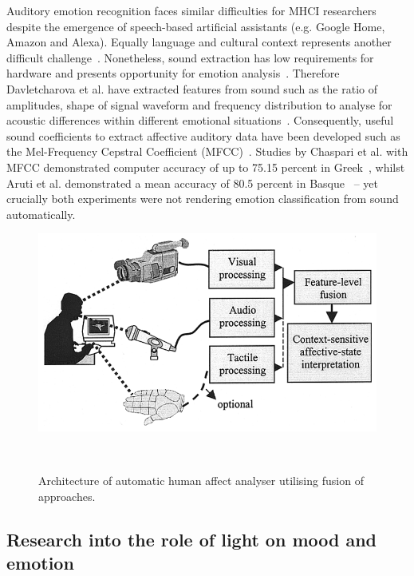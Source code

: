 \documentclass{sigchi}
\begin{document}
Auditory emotion recognition faces similar difficulties for MHCI researchers despite the emergence of speech-based artificial assistants (e.g. Google Home, Amazon and Alexa). Equally language and cultural context represents another difficult challenge~\cite{davletcharova2015detection}. Nonetheless, sound extraction has low requirements for hardware and presents opportunity for emotion analysis~\cite{marechal2019survey}. Therefore Davletcharova et al. have extracted features from sound such as the ratio of amplitudes, shape of signal waveform and frequency distribution to analyse for acoustic differences within different emotional situations~\cite{davletcharova2015detection}. Consequently, useful sound coefficients to extract affective auditory data have been developed such as the Mel-Frequency Cepstral Coefficient (MFCC)~\cite{kathiresan2019cepstral}. Studies by Chaspari et al. with MFCC demonstrated computer accuracy of up to 75.15 percent in Greek~\cite{chaspari2014emotion}, whilst Aruti et al. demonstrated a mean accuracy of 80.5 percent in Basque~\cite{davletcharova2015detection} – yet crucially both experiments were not rendering emotion classification from sound automatically.

\begin{figure}
\centering
  \includegraphics[width=0.9\columnwidth]{figures/Architecture}
  \caption{Architecture of automatic human affect analyser utilising fusion of approaches.}~\cite{pantic2003toward}~\label{fig:figure1}
\end{figure}

\subsection{Research into the role of light on mood and emotion}
\end{document}

